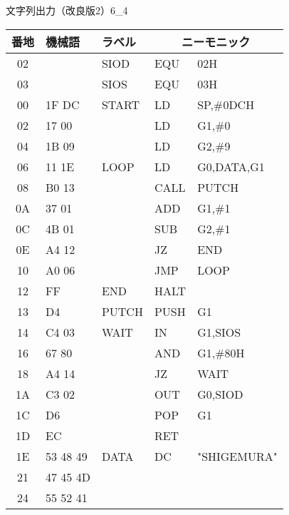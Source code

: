 \begin{figure}[btp]
\begin{reidai}{文字列出力（改良版2）}{6_4}
\begin{description}
{\tt\footnotesize\begin{center}
\begin{tabular}{|c|l|l|l l|} \hline
番地 & 機械語 & ラベル & \multicolumn{2}{|c|}{ニーモニック} \\
\hline
02 &       & SIOD  & EQU  & 02H             \\
03 &       & SIOS  & EQU  & 03H             \\
00 & 1F DC & START & LD   & SP,\#0DCH       \\
02 & 17 00 &       & LD   & G1,\#0          \\
04 & 1B 09 &       & LD   & G2,\#9          \\
06 & 11 1E & LOOP  & LD   & G0,DATA,G1      \\
08 & B0 13 &       & CALL & PUTCH           \\
0A & 37 01 &       & ADD  & G1,\#1          \\
0C & 4B 01 &       & SUB  & G2,\#1          \\
0E & A4 12 &       & JZ   & END             \\
10 & A0 06 &       & JMP  & LOOP            \\
12 & FF    & END   & HALT &                 \\
13 & D4    & PUTCH & PUSH & G1              \\
14 & C4 03 & WAIT  & IN   & G1,SIOS         \\
16 & 67 80 &       & AND  & G1,\#80H        \\
18 & A4 14 &       & JZ   & WAIT            \\
1A & C3 02 &       & OUT  & G0,SIOD         \\
1C & D6    &       & POP  & G1              \\
1D & EC    &       & RET  &                 \\
1E & 53 48 49 & DATA  & DC   & "SHIGEMURA"     \\
21 & 47 45 4D &       &      &                 \\
24 & 55 52 41 &       &      &                 \\
\hline
\end{tabular}
\end{center}}
\end{description}
\end{reidai}
\end{figure}

